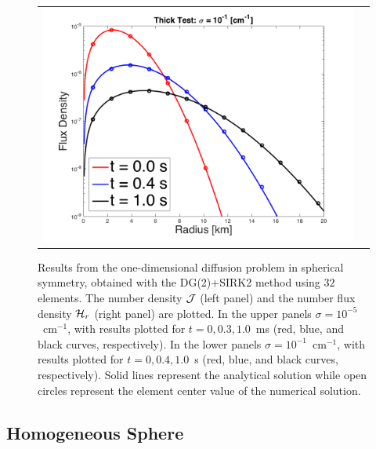 \documentclass[10pt,preprint]{aastex}
\begin{document}
\begin{figure}
\begin{center}
\begin{tabular}{cc}
      \includegraphics[scale=0.38]{./Figures/GaussianSphericalDiffusion_Kappa_1e-1_Flux}
    \end{tabular}
  \end{center}
  \caption{Results from the one-dimensional diffusion problem in spherical symmetry, obtained with the DG(2)+SIRK2 method using $32$ elements.  
  The number density $\mathcal{J}$ (left panel) and the number flux density $\mathcal{H}_{r}$ (right panel) are plotted.  
  In the upper panels $\sigma=10^{-5}$~cm$^{-1}$, with results plotted for $t=0,0.3,1.0$~ms (red, blue, and black curves, respectively).  
  In the lower panels $\sigma=10^{-1}$~cm$^{-1}$, with results plotted for $t=0,0.4,1.0$~s (red, blue, and black curves, respectively).  
  Solid lines represent the analytical solution while open circles represent the element center value of the numerical solution.}
  \label{fig:diffusionProblem}
\end{figure}

\subsection{Homogeneous Sphere}
\end{document}
